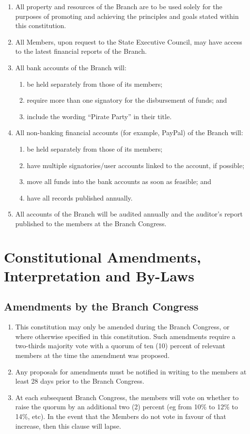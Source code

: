 \documentclass[a4paper,titlepage,8.5pt]{article}
\newcommand{\stateorterritory}{State}
\begin{document}
\begin{enumerate}
\item All property and resources of the Branch are to be used solely for the purposes of promoting and achieving the principles and goals stated within this constitution.
\item All Members, upon request to the {\stateorterritory} Executive Council, may have access to the latest financial reports of the Branch.
\item All bank accounts of the Branch will:
\begin{enumerate}
\item be held separately from those of its members;
\item require more than one signatory for the disbursement of funds; and
\item include the wording ``Pirate Party'' in their title.
\end{enumerate}
\item All non-banking financial accounts (for example, PayPal) of the Branch will:
\begin{enumerate}
\item be held separately from those of its members;
\item have multiple signatories/user accounts linked to the account, if possible;
\item move all funds into the bank accounts as soon as feasible; and
\item have all records published annually.
\end{enumerate}
\item All accounts of the Branch will be audited annually and the auditor’s report published to the members at the Branch Congress.
\end{enumerate}

\section{Constitutional Amendments, Interpretation and By-Laws}

\subsection{Amendments by the Branch Congress}

\begin{enumerate}
\item This constitution may only be amended during the Branch Congress, or where otherwise specified in this constitution. Such amendments require a two-thirds majority vote with a quorum of ten (10) percent of relevant members at the time the amendment was proposed.
\item Any proposals for amendments must be notified in writing to the members at least 28 days prior to the Branch Congress.
\item At each subsequent Branch Congress, the members will vote on whether to raise the quorum by an additional two (2) percent (eg from 10\% to 12\% to 14\%, etc). In the event that the Members do not vote in favour of that increase, then this clause will lapse.
\end{enumerate}
\end{document}
